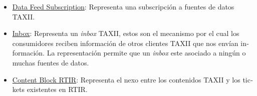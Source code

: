 \begin{itemize}
{	dichas fuentes de información para recibir datos que sean de su interés. }
\item \foreignlanguage{spanish}{\underline{Data Feed Subscription}: Representa una subscripción a fuentes de datos TAXII.}
\item \foreignlanguage{spanish}{\underline{Inbox}: Representa un }\foreignlanguage{spanish}{\textit{inbox
	}}\foreignlanguage{spanish}{TAXII, estos son el mecanismo por el cual los consumidores reciben información de otros
	clientes TAXII que nos envían información. La representación permite que un
}\foreignlanguage{spanish}{\textit{inbox}}\foreignlanguage{spanish}{ este asociado a ningún o muchas fuentes de datos.
}
\item \foreignlanguage{spanish}{\underline{Content Block RTIR}: Representa el nexo entre los contenidos TAXII y los tickets
	existentes en RTIR.}
\end{itemize}
